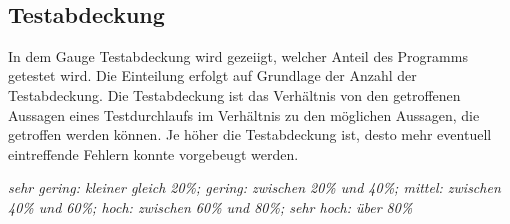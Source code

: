 \documentclass[11pt]{article}
\begin{document}
    \begin{center}
    \end{center}
    { \hspace*{\fill} \\}
    
    \subsection{Testabdeckung}\label{testabdeckung}

In dem Gauge Testabdeckung wird gezeiigt, welcher Anteil des Programms
getestet wird. Die Einteilung erfolgt auf Grundlage der Anzahl der
Testabdeckung. Die Testabdeckung ist das Verhältnis von den getroffenen
Aussagen eines Testdurchlaufs im Verhältnis zu den möglichen Aussagen,
die getroffen werden können. Je höher die Testabdeckung ist, desto mehr
eventuell eintreffende Fehlern konnte vorgebeugt werden.

\emph{sehr gering: kleiner gleich 20\%; gering: zwischen 20\% und 40\%;
mittel: zwischen 40\% und 60\%; hoch: zwischen 60\% und 80\%; sehr hoch:
über 80\%}
\end{document}
